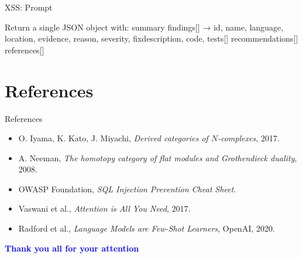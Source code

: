 \documentclass[t,ignorenonframetext]{beamer}
\begin{document}
\begin{frame}{XSS: Prompt}
\begin{tcolorbox}
[colback=blue!5!white,colframe=navy!75!black,title=Tasks]
Return a single JSON object with: \newline
summary
findings[] → {id, name, language, location, evidence, reason, severity, fix{description, code}, tests[]}
recommendations[]
references[]
\end{tcolorbox}
\end{frame} 


\section{References}
\begin{frame}{References}
\tiny
\begin{itemize}
\item O. Iyama, K. Kato, J. Miyachi, \textit{Derived categories of $N$-complexes}, 2017.
\item A. Neeman, \textit{The homotopy category of flat modules and Grothendieck duality}, 2008.
\item OWASP Foundation, \textit{SQL Injection Prevention Cheat Sheet}.
\item Vaswani et al., \textit{Attention is All You Need}, 2017.
\item Radford et al., \textit{Language Models are Few-Shot Learners}, OpenAI, 2020.
\end{itemize}
\end{frame}

\begin{frame}
\vspace{3cm}
\begin{center}
\begin{LARGE}
\textcolor{blue}{\textbf{Thank you all for your attention}}
\end{LARGE}
\end{center}
\end{frame}
\end{document}

